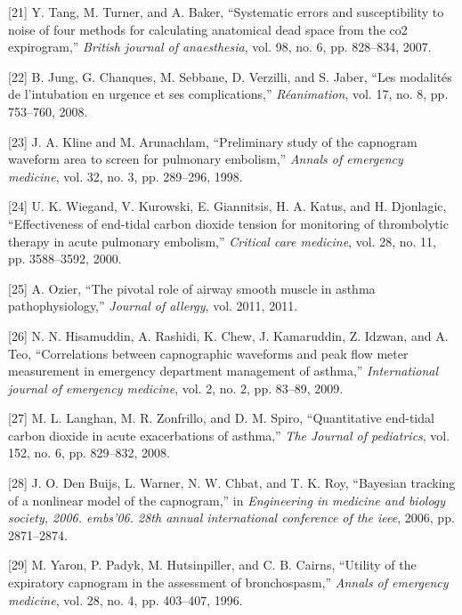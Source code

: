 \documentclass[12pt,]{article}
\begin{document}
\hypertarget{ref-tang2007systematic}{}
{[}21{]} Y. Tang, M. Turner, and A. Baker, ``Systematic errors and
susceptibility to noise of four methods for calculating anatomical dead
space from the co2 expirogram,'' \emph{British journal of anaesthesia},
vol. 98, no. 6, pp. 828--834, 2007.

\hypertarget{ref-jung2008modalites}{}
{[}22{]} B. Jung, G. Chanques, M. Sebbane, D. Verzilli, and S. Jaber,
``Les modalités de l'intubation en urgence et ses complications,''
\emph{Réanimation}, vol. 17, no. 8, pp. 753--760, 2008.

\hypertarget{ref-kline1998preliminary}{}
{[}23{]} J. A. Kline and M. Arunachlam, ``Preliminary study of the
capnogram waveform area to screen for pulmonary embolism,'' \emph{Annals
of emergency medicine}, vol. 32, no. 3, pp. 289--296, 1998.

\hypertarget{ref-wiegand2000effectiveness}{}
{[}24{]} U. K. Wiegand, V. Kurowski, E. Giannitsis, H. A. Katus, and H.
Djonlagic, ``Effectiveness of end-tidal carbon dioxide tension for
monitoring of thrombolytic therapy in acute pulmonary embolism,''
\emph{Critical care medicine}, vol. 28, no. 11, pp. 3588--3592, 2000.

\hypertarget{ref-ozier2011pivotal}{}
{[}25{]} A. Ozier, ``The pivotal role of airway smooth muscle in asthma
pathophysiology,'' \emph{Journal of allergy}, vol. 2011, 2011.

\hypertarget{ref-hisamuddin2009correlations}{}
{[}26{]} N. N. Hisamuddin, A. Rashidi, K. Chew, J. Kamaruddin, Z.
Idzwan, and A. Teo, ``Correlations between capnographic waveforms and
peak flow meter measurement in emergency department management of
asthma,'' \emph{International journal of emergency medicine}, vol. 2,
no. 2, pp. 83--89, 2009.

\hypertarget{ref-langhan2008quantitative}{}
{[}27{]} M. L. Langhan, M. R. Zonfrillo, and D. M. Spiro, ``Quantitative
end-tidal carbon dioxide in acute exacerbations of asthma,'' \emph{The
Journal of pediatrics}, vol. 152, no. 6, pp. 829--832, 2008.

\hypertarget{ref-den2006bayesian}{}
{[}28{]} J. O. Den Buijs, L. Warner, N. W. Chbat, and T. K. Roy,
``Bayesian tracking of a nonlinear model of the capnogram,'' in
\emph{Engineering in medicine and biology society, 2006. embs'06. 28th
annual international conference of the ieee}, 2006, pp. 2871--2874.

\hypertarget{ref-yaron1996utility}{}
{[}29{]} M. Yaron, P. Padyk, M. Hutsinpiller, and C. B. Cairns,
``Utility of the expiratory capnogram in the assessment of
bronchospasm,'' \emph{Annals of emergency medicine}, vol. 28, no. 4, pp.
403--407, 1996.
\end{document}
